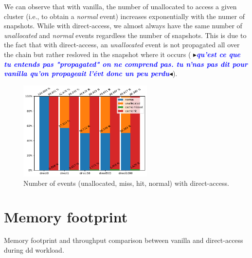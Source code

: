 \documentclass[sigplan,screen,10pt]{acmart}
\newcommand{\mynote}[2]{\fbox{\bfseries\sffamily\footnotesize{\textbf{#1}}}
 {\small$\blacktriangleright$\textsf{\emph{#2}}$\blacktriangleleft$}}
\newcommand{\mynote}[2]{}
\newcommand{\stella}[1]{\mynote{\textcolor{red}{Stella}}{\textcolor{blue}{\textbf{#1}}}}
\begin{document}
	We can observe that with vanilla, the number of unallocated to access a given cluster (i.e., to obtain a \emph{normal} event) increases exponentially with the numer of snapshots.
	While with direct-access, we almost always have the same number of \emph{unallocated} and \emph{normal} events regardless the number of snapshots.
	This is due to the fact that with direct-access, an \emph{unallocated} event is not propagated all over the chain but rather resloved in the snapshot where it occurs (\stella{qu'est ce que tu entends pas "propagated" on ne comprend pas. tu n'nas pas dit pour vanilla qu'on propageait l'évt donc un peu perdu}).
	
	\begin{figure}[h]
		\center
		\includegraphics[width=0.6\textwidth]{number_events_per_chain_di.pdf}
		\caption{Number of events (unallocated, miss, hit, normal) with direct-access.}
		\label{fig:fig37}
	\end{figure}


	\section*{Memory footprint}
	
	Memory footprint and throughput comparison between vanilla and direct-access during dd workload.
	
\end{document}
